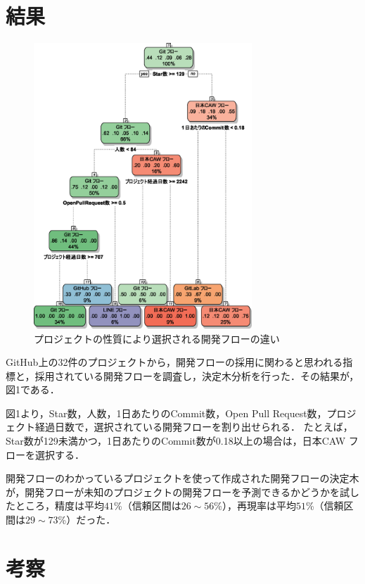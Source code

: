 \documentclass[uplatex,twocolumn]{jsarticle}
\begin{document}
\section{結果}

\begin{figure}[H]
\includegraphics[width=8.2cm,clip]{decisiontree.eps}
\caption{プロジェクトの性質により選択される開発フローの違い}\label{決定木}
\end{figure}

GitHub上の32件のプロジェクトから，開発フローの採用に関わると思われる指標と，採用されている開発フローを調査し，決定木分析を行った．その結果が，図1である．

図1より，Star数，人数，1日あたりのCommit数，Open Pull Request数，プロジェクト経過日数で，選択されている開発フローを割り出せられる．
たとえば，Star数が129未満かつ，1日あたりのCommit数が0.18以上の場合は，日本CAW フローを選択する．

開発フローのわかっているプロジェクトを使って作成された開発フローの決定木が，開発フローが未知のプロジェクトの開発フローを予測できるかどうかを試したところ，精度は平均$41$\%（信頼区間は$26\sim 56$\%），再現率は平均$51$\%（信頼区間は$29\sim 73$\%）だった．




\section{考察}
\end{document}
